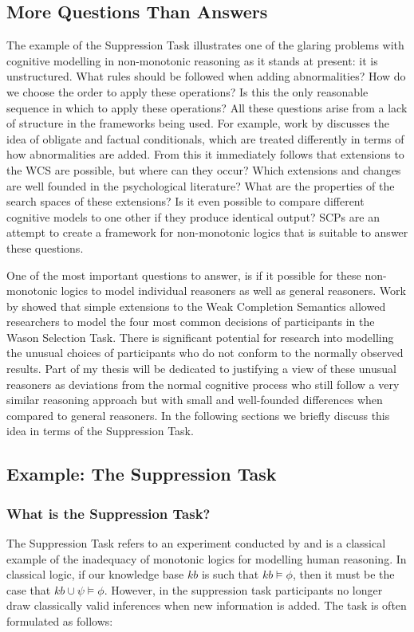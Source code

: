\documentclass{article}
\begin{document}
\subsection{More Questions Than Answers}
The example of the Suppression Task \citep{byrne1989suppressing} illustrates one of the glaring problems with cognitive modelling in non-monotonic reasoning as it stands at present: it is unstructured. What rules should be followed when adding abnormalities? How do we choose the order to apply these operations? Is this the only reasonable sequence in which to apply these operations? All these questions arise from a lack of structure in the frameworks being used. For example, work by \cite{saldanha2017weak} discusses the idea of obligate and factual conditionals, which are treated differently in terms of how abnormalities are added. From this it immediately follows that extensions to the WCS are possible, but where can they occur? Which extensions and changes are well founded in the psychological literature? What are the properties of the search spaces of these extensions? Is it even possible to compare different cognitive models to one other if they produce identical output? SCPs are an attempt to create a framework for non-monotonic logics that is suitable to answer these questions.

One of the most important questions to answer, is if it possible for these non-monotonic logics to model individual reasoners as well as general reasoners. Work by \citep{breu2019weak} showed that simple extensions to the Weak Completion Semantics allowed researchers to model the four most common decisions of participants in the Wason Selection Task. There is significant potential for research into modelling the unusual choices of participants who do not conform to the normally observed results. Part of my thesis will be dedicated to justifying a view of these unusual reasoners as deviations from the normal cognitive process who still follow a very similar reasoning approach but with small and well-founded differences when compared to general reasoners. In the following sections we briefly discuss this idea in terms of the Suppression Task.

\subsection{Example: The Suppression Task}
\subsubsection{What is the Suppression Task?}
The Suppression Task refers to an experiment conducted by \cite{byrne1989suppressing} and is a classical example of the inadequacy of monotonic logics for modelling human reasoning. In classical logic, if our knowledge base $kb$ is such that $kb \models \phi$, then it must be the case that $kb \cup \psi \models \phi$. However, in the suppression task participants no longer draw classically valid inferences when new information is added. The task is often formulated as follows:
\end{document}
